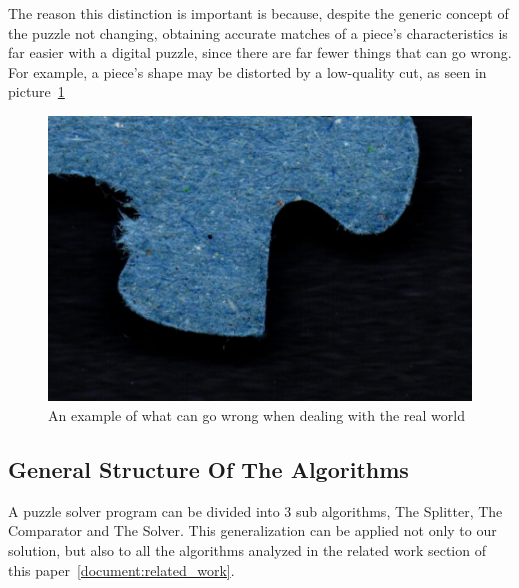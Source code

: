 \documentclass{article}
\begin{document}
The reason this distinction is important is because,
despite the generic concept of the puzzle not changing,
obtaining accurate matches of a piece's characteristics
is far easier with a digital puzzle,
since there are far fewer things that can go wrong.
For example, a piece's shape may be distorted by
a low-quality cut, as seen in picture~\cref{fig:figure_measurement_error}

\begin{figure}[H]
    \caption{An example of what can go wrong when dealing with the real world}\label{fig:figure_measurement_error}
    \includegraphics[height=0.25\textwidth]{pictures/example_bad_piece.jpg}
    \centering
\end{figure}

\subsection{General Structure Of The Algorithms}

A puzzle solver program can be divided into 3 sub algorithms,
The Splitter, The Comparator and The Solver.
This generalization can be applied not only to our solution,
but also to all the algorithms analyzed in the related
work section of this paper~\cref{document:related_work}.
\end{document}
